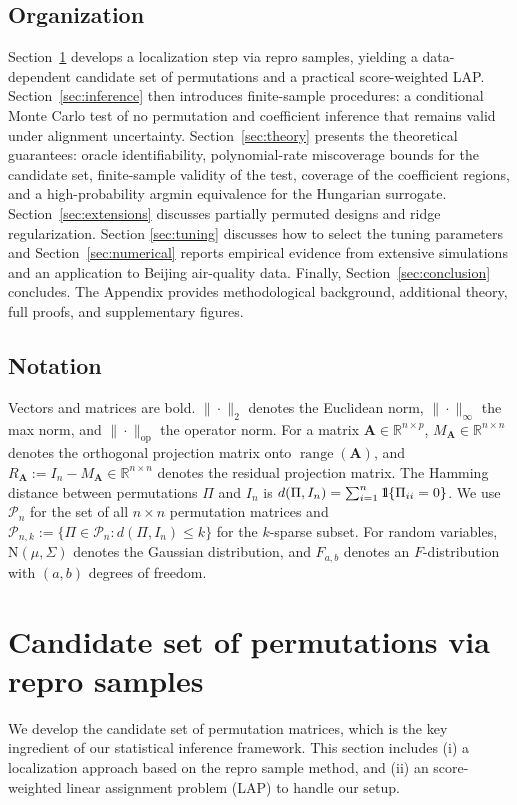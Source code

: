 \documentclass[11pt, reqno]{amsart}
\newcommand{\R}{\mathbb{R}}
\renewcommand{\le}{\leqslant}
\newcommand{\mP}{\mathcal{P}}
\newcommand{\1}{\mbox{1}\hspace{-0.25em}\mbox{l}}
\DeclareMathOperator{\range}{range}
\newcommand{\Normal}{\mathrm{N}}
\theoremstyle{definition}\newtheorem{problem}{Problem}[section]
\theoremstyle{definition}\newtheorem{definition}[problem]{Definition}
\theoremstyle{remark}\newtheorem{assumption}{Assumption}
\theoremstyle{remark}\newtheorem{remark}[problem]{Remark}
\theoremstyle{definition}\newtheorem{example}[problem]{Example}
\theoremstyle{plain}\newtheorem{theorem}[problem]{Theorem}
\theoremstyle{plain}\newtheorem{question}[problem]{Question}
\theoremstyle{plain}\newtheorem{lemma}[problem]{Lemma}
\theoremstyle{plain}\newtheorem{proposition}[problem]{Proposition}
\theoremstyle{plain}\newtheorem{corollary}[problem]{Corollary}
\theoremstyle{plain}\newtheorem{conjecture}[problem]{Conjecture}
\begin{document}
\subsection{Organization}
Section~\ref{sec:methodology} develops a localization step via repro samples, yielding a data-dependent candidate set of permutations and a practical score-weighted LAP. Section~\ref{sec:inference} then introduces finite-sample procedures: a conditional Monte Carlo test of no permutation and coefficient inference that remains valid under alignment uncertainty. Section~\ref{sec:theory} presents the theoretical guarantees: oracle identifiability, polynomial-rate miscoverage bounds for the candidate set, finite-sample validity of the test, coverage of the coefficient regions, and a high-probability argmin equivalence for the Hungarian surrogate. Section~\ref{sec:extensions} discusses partially permuted designs and ridge regularization. Section \ref{sec:tuning} discusses how to select the tuning parameters and Section~\ref{sec:numerical} reports empirical evidence from extensive simulations and an application to Beijing air-quality data. Finally, Section~\ref{sec:conclusion} concludes. The Appendix provides methodological background, additional theory, full proofs, and supplementary figures.



\subsection{Notation}
Vectors and matrices are bold.  
$\|\cdot\|_2$ denotes the Euclidean norm, $\|\cdot\|_\infty$ the max norm, and $\|\cdot\|_{\mathrm{op}}$ the operator norm.  
For a matrix $\bm A\in\R^{n\times p}$, $M_{\bm{A}} \in \R^{n \times n}$ denotes the orthogonal projection matrix onto $\range(\bm{A})$, and $R_{\bm{A}}:=I_n-M_{\bm{A}}\in \R^{n \times n}$ denotes the residual projection matrix.
The Hamming distance between permutations $\Pi$ and $I_n$ is $d(\Pi,I_n)=\sum_{i=1}^n\1\{\Pi_{ii}=0\}$.
We use $\mP_n$ for the set of all $n\times n$ permutation matrices and $\mP_{n,k}:=\{\Pi\in\mP_n: d(\Pi,I_n)\le k\}$ for the $k$-sparse subset.  
For random variables, $\Normal(\mu,\Sigma)$ denotes the Gaussian distribution, and $F_{a,b}$ denotes an $F$-distribution with $(a,b)$ degrees of freedom.  


\section{Candidate set of permutations via repro samples}\label{sec:methodology}
We develop the candidate set of permutation matrices, which is the key ingredient of our statistical inference framework.
This section includes (i) a localization approach based on the repro sample method, and (ii) an score-weighted linear assignment problem (LAP) to handle our setup.
\end{document}
